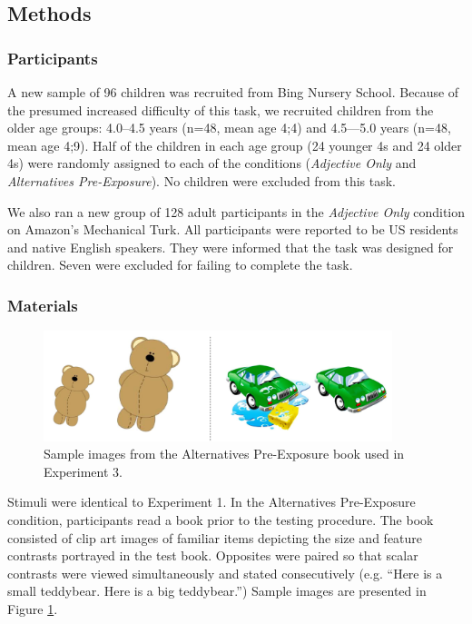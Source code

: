 \documentclass[man]{apa2}
\begin{document}
\subsection{Methods}

\subsubsection{Participants}

A new sample of 96 children was recruited from Bing Nursery School.  Because of the presumed increased difficulty of this task, we recruited children from the older age groups: 4.0--4.5 years (n=48, mean age 4;4) and 4.5---5.0 years (n=48, mean age 4;9).  Half of the children in each age group (24 younger 4s and 24 older 4s) were randomly assigned to each of the conditions (\emph{Adjective Only} and \emph{Alternatives Pre-Exposure}). No children were excluded from this task. 

We also ran a new group of 128 adult participants in the \emph{Adjective Only} condition on Amazon's Mechanical Turk.  All participants were reported to be US residents and native English speakers.  They were informed that the task was designed for children.  Seven were excluded for failing to complete the task. 

\subsubsection{Materials}

\begin{figure}[t] 
  \begin{center} 
    \includegraphics[width=4in]{figures/aliens_book_demo_mod.png} 
    \caption{\label{fig:book_demo} Sample images from the Alternatives Pre-Exposure book used in Experiment 3.}
  \end{center} 
\end{figure}

Stimuli were identical to Experiment 1. In the Alternatives Pre-Exposure condition, participants read a book prior to the testing procedure.  The book consisted of clip art images of familiar items depicting the size and feature contrasts portrayed in the test book. Opposites were paired so that scalar contrasts were viewed simultaneously and stated consecutively (e.g. ``Here is a small teddybear.  Here is a big teddybear.'')  Sample images are presented in Figure \ref{fig:book_demo}.
\end{document}
